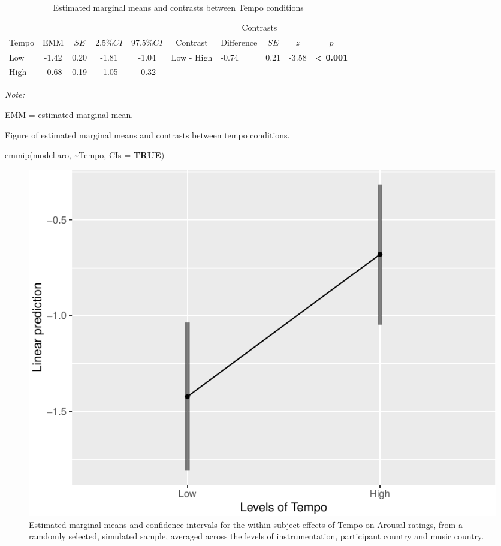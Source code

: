 \documentclass[
  bookmarksnumbered]{article}
\newenvironment{Shaded}{\begin{snugshade}}{\end{snugshade}}
\newcommand{\AttributeTok}[1]{\textcolor[rgb]{0.80,0.80,0.80}{#1}}
\newcommand{\ConstantTok}[1]{\textcolor[rgb]{0.86,0.64,0.64}{\textbf{#1}}}
\newcommand{\FunctionTok}[1]{\textcolor[rgb]{0.94,0.94,0.56}{#1}}
\newcommand{\NormalTok}[1]{\textcolor[rgb]{0.80,0.80,0.80}{#1}}
\newcommand{\SpecialCharTok}[1]{\textcolor[rgb]{0.86,0.64,0.64}{#1}}
\begin{document}
\begin{table}[H]

\caption{\label{tab:tab-aro-emms}Estimated marginal means and contrasts between Tempo conditions}
\centering
\begin{threeparttable}
\begin{tabular}[t]{lccccclccc}
\toprule
\multicolumn{5}{c}{ } & \multicolumn{5}{c}{Contrasts} \\
\cmidrule(l{3pt}r{3pt}){6-10}
Tempo & EMM & $SE$ & $2.5\% CI$ & $97.5\% CI$ & Contrast & Difference & $SE$ & $z$ & $p$\\
\midrule
Low & -1.42 & 0.20 & -1.81 & -1.04 & Low - High & -0.74 & 0.21 & -3.58 & \textbf{< 0.001}\\
High & -0.68 & 0.19 & -1.05 & -0.32 &  &  &  &  & \\
\bottomrule
\end{tabular}
\begin{tablenotes}[para]
\item \textit{Note: } 
\item EMM = estimated marginal mean.
\end{tablenotes}
\end{threeparttable}
\end{table}

Figure of estimated marginal means and contrasts between tempo conditions.

\begin{Shaded}
\begin{Highlighting}[]
\FunctionTok{emmip}\NormalTok{(model.aro, }\SpecialCharTok{\textasciitilde{}}\NormalTok{Tempo, }\AttributeTok{CIs =} \ConstantTok{TRUE}\NormalTok{)}
\end{Highlighting}
\end{Shaded}

\begin{figure}
\centering
\includegraphics{Power_analysis_files/figure-latex/unnamed-chunk-19-1.pdf}
\caption{\label{fig:unnamed-chunk-19}Estimated marginal means and confidence intervals for the within-subject effects of Tempo on Arousal ratings, from a ramdomly selected, simulated sample, averaged across the levels of instrumentation, participant country and music country.}
\end{figure}
\end{document}
